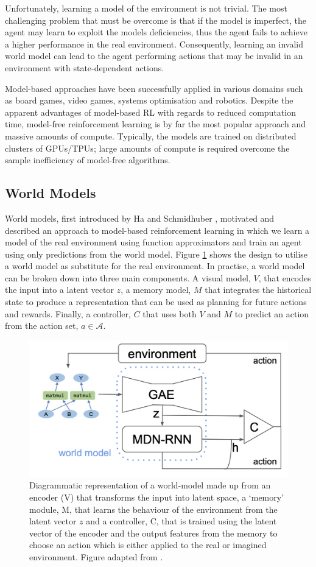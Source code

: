 Unfortunately, learning a model of the environment is not trivial. The most challenging problem that must be overcome is that if the model is imperfect, the agent may learn to exploit the models deficiencies, thus the agent fails to achieve a higher performance in the real environment. Consequently, learning an invalid world model can lead to the agent performing actions that may be invalid in an environment with state-dependent actions.

Model-based approaches have been successfully applied in various domains such as board games, video games, systems optimisation and robotics. Despite the apparent advantages of model-based RL with regards to reduced computation time, model-free reinforcement learning is by far the most popular approach and massive amounts of compute. Typically, the models are trained on distributed clusters of GPUs/TPUs; large amounts of compute is required overcome the sample inefficiency of model-free algorithms.

\subsection{World Models}
World models, first introduced by Ha and Schmidhuber \cite{ha2018worldmodels}, motivated and described an approach to model-based reinforcement learning in which we learn a model of the real environment using function approximators and train an agent using only predictions from the world model. Figure \ref{fig:bg:mb-rl} shows the design to utilise a world model as substitute for the real environment. In practise, a world model can be broken down into three main components. A visual model, $V$, that encodes the input into a latent vector $z$, a memory model, $M$ that integrates the historical state to produce a representation that can be used as planning for future actions and rewards. Finally, a controller, $C$ that uses both $V$ and $M$ to predict an action from the action set, $a \in \mathcal{A}$.

\begin{figure}[ht]
  \centering
  \includegraphics[width=0.75\columnwidth]{sections/2background/images/mb-rl}
  \caption[Model-based Reinforcement Learning End-To-End System]{Diagrammatic representation of a world-model made up from an encoder (V) that transforms the input into latent space, a `memory' module, M, that learns the behaviour of the environment from the latent vector $z$ and a controller, C, that is trained using the latent vector of the encoder and the output features from the memory to choose an action which is either applied to the real or imagined environment. Figure adapted from \cite{ha2018worldmodels}.}
  \label{fig:bg:mb-rl}
\end{figure}

